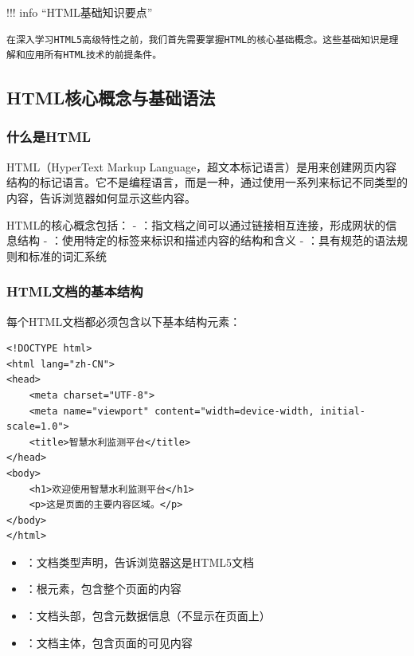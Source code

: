 !!! info ``HTML基础知识要点''

\begin{verbatim}
在深入学习HTML5高级特性之前，我们首先需要掌握HTML的核心基础概念。这些基础知识是理解和应用所有HTML技术的前提条件。
\end{verbatim}

\hypertarget{htmlux6838ux5fc3ux6982ux5ff5ux4e0eux57faux7840ux8bedux6cd5}{%
\subsection{HTML核心概念与基础语法}\label{htmlux6838ux5fc3ux6982ux5ff5ux4e0eux57faux7840ux8bedux6cd5}}

\hypertarget{ux4ec0ux4e48ux662fhtml}{%
\subsubsection{什么是HTML}\label{ux4ec0ux4e48ux662fhtml}}

HTML（HyperText Markup Language，超文本标记语言）是用来创建网页内容结构的标记语言。它不是编程语言，而是一种，通过使用一系列来标记不同类型的内容，告诉浏览器如何显示这些内容。

HTML的核心概念包括： - ：指文档之间可以通过链接相互连接，形成网状的信息结构 - ：使用特定的标签来标识和描述内容的结构和含义 - ：具有规范的语法规则和标准的词汇系统

\hypertarget{htmlux6587ux6863ux7684ux57faux672cux7ed3ux6784}{%
\subsubsection{HTML文档的基本结构}\label{htmlux6587ux6863ux7684ux57faux672cux7ed3ux6784}}

每个HTML文档都必须包含以下基本结构元素：

\begin{lstlisting}[style=xml]
<!DOCTYPE html>
<html lang="zh-CN">
<head>
    <meta charset="UTF-8">
    <meta name="viewport" content="width=device-width, initial-scale=1.0">
    <title>智慧水利监测平台</title>
</head>
<body>
    <h1>欢迎使用智慧水利监测平台</h1>
    <p>这是页面的主要内容区域。</p>
</body>
</html>
\end{lstlisting}


\begin{itemize}
\tightlist
\item
  ：文档类型声明，告诉浏览器这是HTML5文档
\item
  ：根元素，包含整个页面的内容
\item
  ：文档头部，包含元数据信息（不显示在页面上）
\item
  ：文档主体，包含页面的可见内容
\end{itemize}

